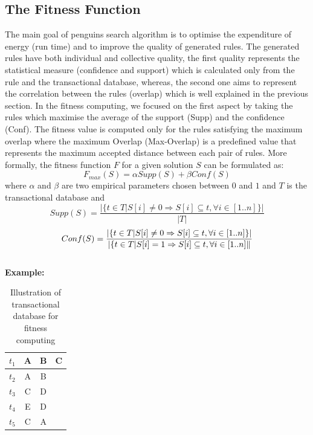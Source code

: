 \documentclass[preprint,12pt]{elsarticle}
\begin{document}
\subsection{The Fitness Function}
The main goal of penguins search algorithm is to optimise the
expenditure of energy (run time) and to improve the
quality of generated rules. The generated rules have both
individual and collective quality, the first quality represents
the statistical measure (confidence and support) which is
calculated only from the rule and the transactional database,
whereas, the second one aims to represent the correlation between
the rules (overlap) which is well explained in the previous
section. In the fitness computing, we focused on the first aspect
by taking the rules which maximise the average of the support (Supp) and the confidence (Conf). The fitness value is computed only for the rules satisfying the maximum overlap where
the maximum Overlap (Max-Overlap) is a predefined value that represents the
maximum accepted distance between each pair of rules.
More formally, the fitness function $F$ for a given solution $S$
can be formulated as:\\
\begin{equation}
\label{equa:eq1} F_{max}(S)=\alpha Supp(S) + \beta Conf
(S)
\end{equation}
where $\alpha$ and $\beta$ are two empirical parameters chosen between
$0$ and $1$ and $T$ is the transactional database and \\
\begin{equation*}
Supp(S)= \frac{|\{t \in T | S[i] \neq 0 \Rightarrow S[i]
\subseteq t,  \forall i \in [1..n]\}|}{|T|}
\end{equation*}
\begin{equation*}
Conf(S)= \frac{|\{t \in T | S[i]\neq 0 \Rightarrow
S[i]\subseteq t, \forall i \in [1..n]\}|}{|\{t \in T | S[i]=1
\Rightarrow S[i]\subseteq t, \forall i \in [1..n]\|}\\
\end{equation*}
\\
\textbf{Example:}
\begin{table}[h]
\centering
\begin{tabular}{c c c c}
\hline
$t_{1}$& A & B & C\\
\hline
$t_{2}$& A & B & \\
\hline
$t_{3}$& C & D & \\
\hline
$t_{4}$& E & D & \\
\hline
$t_{5}$& C & A &\\
\hline
\end{tabular}
\caption{Illustration of transactional database for fitness computing}
\label{TransacionalDatabaseIllustration}
\end{table}
\end{document}
